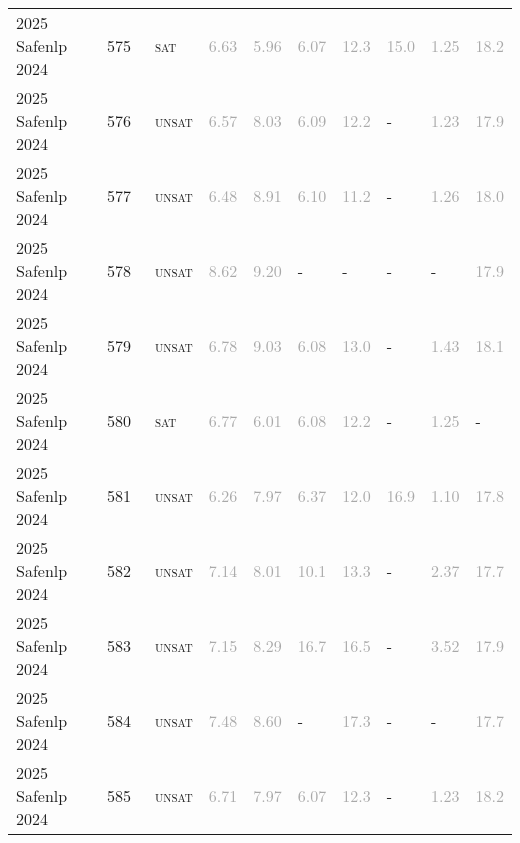\begin{center}
{\begin{longtable}{@{}llllllllll@{}}
2025 Safenlp 2024 & 575 & ~\textsc{sat} & \textcolor{darkgray}{6.63} & \textcolor{darkgray}{5.96} & \textcolor{darkgray}{6.07} & \textcolor{darkgray}{12.3} & \textcolor{darkgray}{15.0} & \textcolor{darkgray}{1.25} & \textcolor{darkgray}{18.2} \\
2025 Safenlp 2024 & 576 & ~\textsc{unsat} & \textcolor{darkgray}{6.57} & \textcolor{darkgray}{8.03} & \textcolor{darkgray}{6.09} & \textcolor{darkgray}{12.2} & - & \textcolor{darkgray}{1.23} & \textcolor{darkgray}{17.9} \\
2025 Safenlp 2024 & 577 & ~\textsc{unsat} & \textcolor{darkgray}{6.48} & \textcolor{darkgray}{8.91} & \textcolor{darkgray}{6.10} & \textcolor{darkgray}{11.2} & - & \textcolor{darkgray}{1.26} & \textcolor{darkgray}{18.0} \\
2025 Safenlp 2024 & 578 & ~\textsc{unsat} & \textcolor{darkgray}{8.62} & \textcolor{darkgray}{9.20} & - & - & - & - & \textcolor{darkgray}{17.9} \\
2025 Safenlp 2024 & 579 & ~\textsc{unsat} & \textcolor{darkgray}{6.78} & \textcolor{darkgray}{9.03} & \textcolor{darkgray}{6.08} & \textcolor{darkgray}{13.0} & - & \textcolor{darkgray}{1.43} & \textcolor{darkgray}{18.1} \\
2025 Safenlp 2024 & 580 & ~\textsc{sat} & \textcolor{darkgray}{6.77} & \textcolor{darkgray}{6.01} & \textcolor{darkgray}{6.08} & \textcolor{darkgray}{12.2} & - & \textcolor{darkgray}{1.25} & - \\
2025 Safenlp 2024 & 581 & ~\textsc{unsat} & \textcolor{darkgray}{6.26} & \textcolor{darkgray}{7.97} & \textcolor{darkgray}{6.37} & \textcolor{darkgray}{12.0} & \textcolor{darkgray}{16.9} & \textcolor{darkgray}{1.10} & \textcolor{darkgray}{17.8} \\
2025 Safenlp 2024 & 582 & ~\textsc{unsat} & \textcolor{darkgray}{7.14} & \textcolor{darkgray}{8.01} & \textcolor{darkgray}{10.1} & \textcolor{darkgray}{13.3} & - & \textcolor{darkgray}{2.37} & \textcolor{darkgray}{17.7} \\
2025 Safenlp 2024 & 583 & ~\textsc{unsat} & \textcolor{darkgray}{7.15} & \textcolor{darkgray}{8.29} & \textcolor{darkgray}{16.7} & \textcolor{darkgray}{16.5} & - & \textcolor{darkgray}{3.52} & \textcolor{darkgray}{17.9} \\
2025 Safenlp 2024 & 584 & ~\textsc{unsat} & \textcolor{darkgray}{7.48} & \textcolor{darkgray}{8.60} & - & \textcolor{darkgray}{17.3} & - & - & \textcolor{darkgray}{17.7} \\
2025 Safenlp 2024 & 585 & ~\textsc{unsat} & \textcolor{darkgray}{6.71} & \textcolor{darkgray}{7.97} & \textcolor{darkgray}{6.07} & \textcolor{darkgray}{12.3} & - & \textcolor{darkgray}{1.23} & \textcolor{darkgray}{18.2} \\

\end{longtable}}
\end{center}
